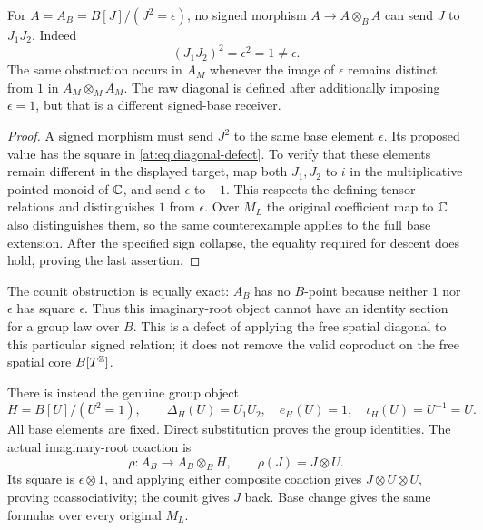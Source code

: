\begin{theorem}
\label{at:thm:diagonal-failure}
For $A=A_B=B[J]/(J^2=\epsilon)$, no signed morphism
$A\to A\otimes_BA$ can send $J$ to $J_1J_2$.
Indeed
\[
 (J_1J_2)^2=\epsilon^2=1\ne\epsilon.
 \tag{AT10}\label{at:eq:diagonal-defect}
\]
The same obstruction occurs in $A_M$ whenever the image of
$\epsilon$ remains distinct from $1$ in $A_M\otimes_MA_M$.
The raw diagonal is defined after additionally imposing
$\epsilon=1$, but that is a different signed-base receiver.
\end{theorem}
\begin{proof}
A signed morphism must send $J^2$ to the same base element
$\epsilon$. Its proposed value has the square in
\eqref{at:eq:diagonal-defect}. To verify that these elements remain
different in the displayed target, map both $J_1,J_2$ to $i$
in the multiplicative pointed monoid of $\mathbb C$, and send
$\epsilon$ to $-1$. This respects the defining tensor relations
and distinguishes $1$ from $\epsilon$. Over $M_L$ the original
coefficient map to $\mathbb C$ also distinguishes them, so the same
counterexample applies to the full base extension. After the
specified sign collapse, the equality required for descent
does hold, proving the last assertion.
\end{proof}

The counit obstruction is equally exact: $A_B$ has no $B$-point
because neither $1$ nor $\epsilon$ has square $\epsilon$.
Thus this imaginary-root object cannot have an identity section
for a group law over $B$. This is a defect of applying the free
spatial diagonal to this particular signed relation; it does not
remove the valid coproduct on the free spatial core $B[T^{\mathbb Z}]$.

There is instead the genuine group object
\[
 H=B[U]/(U^2=1),\qquad
 \Delta_H(U)=U_1U_2,\quad e_H(U)=1,\quad\iota_H(U)=U^{-1}=U.
 \tag{AT11}\label{at:eq:mu-two}
\]
All base elements are fixed. Direct substitution proves the
group identities. The actual imaginary-root coaction is
\[
 \rho:A_B\longrightarrow A_B\otimes_BH,
 \qquad \rho(J)=J\otimes U.
 \tag{AT12}\label{at:eq:coaction}
\]
Its square is $\epsilon\otimes1$, and applying either composite
coaction gives $J\otimes U\otimes U$, proving coassociativity;
the counit gives $J$ back. Base change gives the same formulas
over every original $M_L$.

